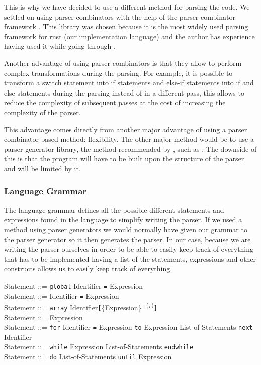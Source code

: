 \documentclass{article}
\begin{document}
This is why we have decided to use a different method for parsing the code. We
settled on using parser combinators with the help of the parser combinator
framework . This library was chosen because it is the most widely
used parsing framework for rust (our implementation language) and the author
has experience having used it while going through \textcite{eopl}.

Another advantage of using parser combinators is that they allow to perform
complex transformations during the parsing. For example, it is possible to
transform a switch statement into if statements and else-if statements into
if and else statements during the parsing instead of in a different pass, this
allows to reduce the complexity of subsequent passes at the cost of increasing
the complexity of the parser.

This advantage comes directly from another major advantage of using a parser
combinator based method: flexibility. The other major method would be to use a
parser generator library, the method recommended by \textcite{eopl}, such as
\textcite{bison}. The downside of this is that the program will have to be
built upon the structure of the parser and will be limited by it.

\subsubsection{Language Grammar}

The language grammar defines all the possible different statements and
expressions found in the language to simplify writing the parser. If we used a
method using parser generators we would normally have given our grammar to the
parser generator so it then generates the parser. In our case, because we are
writing the parser ourselves in order to be able to easily keep track of
everything that has to be implemented having a list of the statements,
expressions and other constructs allows us to easily keep track of everything.

\noindent
Statement ::= \texttt{global} Identifier \texttt{=} Expression\\
Statement ::= Identifier \texttt{=} Expression\\
Statement ::= \texttt{array} Identifier\texttt{[}\{Expression\}\textsuperscript{+(\texttt{,})}\texttt{]}\\
Statement ::= Expression\\
Statement ::= \texttt{for} Identifier \texttt{=} Expression \texttt{to} Expression List-of-Statements \texttt{next} Identifier\\
Statement ::= \texttt{while} Expression List-of-Statements \texttt{endwhile}\\
Statement ::= \texttt{do} List-of-Statements \texttt{until} Expression\\
\end{document}
